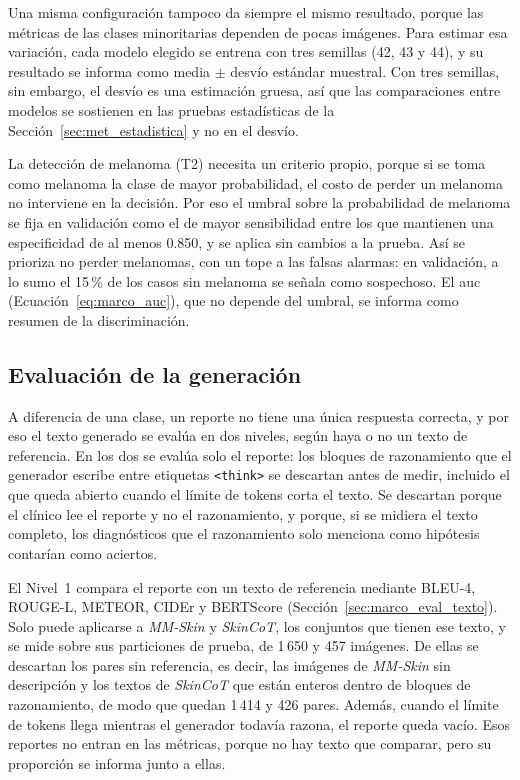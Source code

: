Una misma configuración tampoco da siempre el mismo resultado, porque las métricas de las clases minoritarias dependen
de pocas imágenes. Para estimar esa variación, cada modelo elegido se entrena con tres semillas (42, 43 y 44), y su
resultado se informa como media $\pm$ desvío estándar muestral. Con tres semillas, sin embargo, el desvío es una
estimación gruesa, así que las comparaciones entre modelos se sostienen en las pruebas estadísticas de la
Sección~\ref{sec:met_estadistica} y no en el desvío.

La detección de melanoma (T2) necesita un criterio propio, porque si se toma como melanoma la clase de mayor
probabilidad, el costo de perder un melanoma no interviene en la decisión. Por eso el umbral sobre la probabilidad de
melanoma se fija en validación como el de mayor sensibilidad entre los que mantienen una especificidad de al menos
0.850, y se aplica sin cambios a la prueba. Así se prioriza no perder melanomas, con un tope a las falsas alarmas: en
validación, a lo sumo el 15\,\% de los casos sin melanoma se señala como sospechoso. El \gls{auc}
(Ecuación~\ref{eq:marco_auc}), que no depende del umbral, se informa como resumen de la discriminación.

\subsection{Evaluación de la generación}
\label{sec:met_eval_generacion}

A diferencia de una clase, un reporte no tiene una única respuesta correcta, y por eso el texto generado se evalúa en
dos niveles, según haya o no un texto de referencia. En los dos se evalúa solo el reporte: los bloques de razonamiento
que el generador escribe entre etiquetas \texttt{\textless{}think\textgreater{}} se descartan antes de medir, incluido
el que queda abierto cuando el límite de tokens corta el texto. Se descartan porque el clínico lee el reporte y no el
razonamiento, y porque, si se midiera el texto completo, los diagnósticos que el razonamiento solo menciona como
hipótesis contarían como aciertos.

El Nivel~1 compara el reporte con un texto de referencia mediante BLEU-4, ROUGE-L, METEOR, CIDEr y BERTScore
(Sección~\ref{sec:marco_eval_texto}). Solo puede aplicarse a \emph{MM-Skin} y \emph{SkinCoT}, los conjuntos que tienen
ese texto, y se mide sobre sus particiones de prueba, de 1\,650 y 457 imágenes. De ellas se descartan los pares sin
referencia, es decir, las imágenes de \emph{MM-Skin} sin descripción y los textos de \emph{SkinCoT} que están enteros
dentro de bloques de razonamiento, de modo que quedan 1\,414 y 426 pares. Además, cuando el límite de tokens llega
mientras el generador todavía razona, el reporte queda vacío. Esos reportes no entran en las métricas, porque no hay
texto que comparar, pero su proporción se informa junto a ellas.


